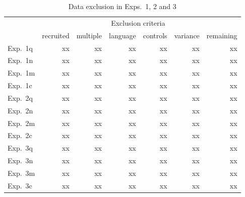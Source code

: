 \documentclass[11pt,fleqn]{article}
\newcommand{\6}{\mbox{$[\hspace*{-.6mm}[$}}
\newcommand{\9}{\mbox{$]\hspace*{-.6mm}]$}}
\begin{document}
\begin{table}[h!]
\centering
\begin{tabular}{l r | r r r r | r}
&  & \multicolumn{4}{c|}{Exclusion criteria} &  \\ 
&  recruited & multiple & language & controls & variance & remaining \\ 
\hline
Exp.~1q & xx & xx & xx & xx & xx & xx \\
Exp.~1n & xx & xx & xx & xx & xx & xx \\
Exp.~1m & xx & xx & xx & xx & xx & xx \\
Exp.~1c & xx & xx & xx & xx & xx & xx \\
Exp.~2q & xx & xx & xx & xx & xx & xx \\
Exp.~2n & xx & xx & xx & xx & xx & xx \\
Exp.~2m & xx & xx & xx & xx & xx & xx \\
Exp.~2c & xx & xx & xx & xx & xx & xx \\
Exp.~3q & xx & xx & xx & xx & xx & xx \\
Exp.~3n & xx & xx & xx & xx & xx & xx \\
Exp.~3m & xx & xx & xx & xx & xx & xx \\
Exp.~3c & xx & xx & xx & xx & xx & xx \\
\end{tabular}
\caption{Data exclusion in Exps.~1, 2 and 3}\label{f-exclusion}
\end{table} 
\end{document}
